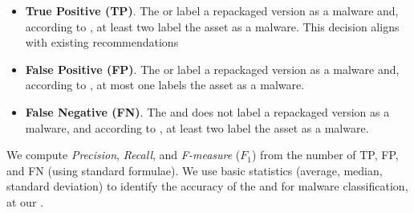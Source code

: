 \begin{itemize}
\item {\bf True Positive (TP)}. The \mas or \ml label a repackaged version as a malware and, according to
  \vt, at least two \ses label the asset as a malware. This decision aligns with existing recommendations~\cite{vt-label,DBLP:journals/ese/KhanmohammadiEH19}
   
\item {\bf False Positive (FP)}. The \mas or \ml label a repackaged version as a malware and, according to \vt, at most one \se labels the asset as a malware.

\item {\bf False Negative (FN)}. The \mas and \ml does not label a repackaged version as a malware, and according to \vt, at least two \ses label the asset as a malware.
\end{itemize}

We compute \emph{Precision}, \emph{Recall}, and \emph{F-measure} ($F_1$) from
the number of TP, FP, and FN (using standard
formulae). We use basic statistics (average, median, standard deviation) to identify the
accuracy of the \mas and \ml for malware classification, at our \cds.
